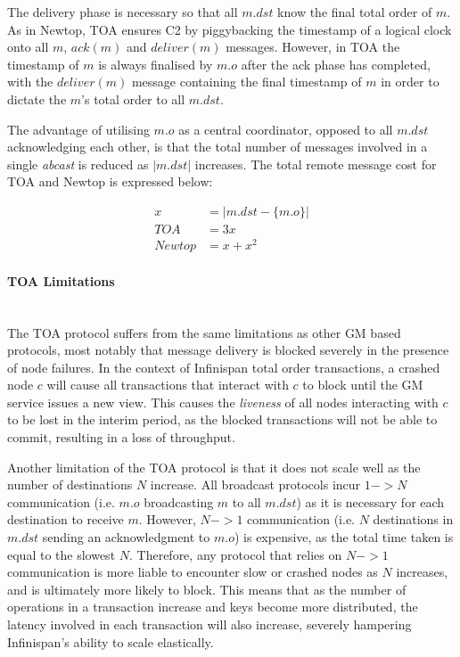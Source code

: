			The delivery phase is necessary so that all $m.dst$ know the final total order of $m$.  As in Newtop, TOA ensures C2 by piggybacking the timestamp of a logical clock onto all $m$, $ack(m)$ and $deliver(m)$ messages.  However, in TOA the timestamp of $m$ is always finalised by $m.o$ after the ack phase has completed, with the $deliver(m)$ message containing the final timestamp of $m$ in order to dictate the $m$'s total order to all $m.dst$.  
			
			The advantage of utilising $m.o$ as a central coordinator, opposed to all $m.dst$ acknowledging each other, is that the total number of messages involved in a single \emph{abcast} is reduced as $\left\vert m.dst \right\vert$ increases.  The total remote message cost for TOA and Newtop is expressed below:
			
			\begin{equation*}
		     \begin{aligned}
		       x &= \left\vert m.dst-\{m.o\} \right\vert \\
		       TOA & = 3x \\
		       Newtop & = x + x^2
		     \end{aligned}
		    \end{equation*}

	        \paragraph{TOA Limitations} \hspace{0pt} \\
			The TOA protocol suffers from the same limitations as other GM based protocols, most notably that message delivery is blocked severely in the presence of node failures.  In the context of Infinispan total order transactions, a crashed node $c$ will cause all transactions that interact with $c$ to block until the GM service issues a new view.  This causes the \emph{liveness} of all nodes interacting with $c$ to be lost in the interim period, as the blocked transactions will not be able to commit, resulting in a loss of throughput.  
	        
	        Another limitation of the TOA protocol is that it does not scale well as the number of destinations $N$ increase.  All broadcast protocols incur $1->N$ communication (i.e. $m.o$ broadcasting $m$ to all $m.dst$) as it is necessary for each destination to receive $m$.  However, $N->1$ communication (i.e. $N$ destinations in $m.dst$ sending an acknowledgment to $m.o$) is expensive, as the total time taken is equal to the slowest $N$.  Therefore, any protocol that relies on $N->1$ communication is more liable to encounter slow or crashed nodes as $N$ increases, and is ultimately more likely to block.  This means that as the number of operations in a transaction increase and keys become more distributed, the latency involved in each transaction will also increase, severely hampering Infinispan's ability to scale elastically.  
	        


